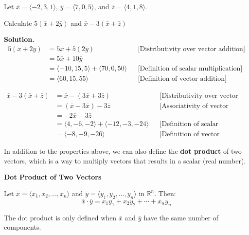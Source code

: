 

\begin{examplebox}
Let $\bar{x} = \langle -2, 3, 1 \rangle$, $\bar{y} = \langle 7, 0, 5 \rangle$, and $\bar{z} = \langle 4, 1, 8 \rangle$.

\vspace{1em}

Calculate $5(\bar{x} + 2\bar{y})$ and $\bar{x} - 3(\bar{x} + \bar{z})$

\vspace{1em}

\noindent\textbf{Solution.}
\begin{align*}
5(\bar{x} + 2\bar{y}) 
&= 5\bar{x} + 5(2\bar{y}) && \text{[Distributivity over vector addition]} \\
&= 5\bar{x} + 10\bar{y} \\
&= \langle -10, 15, 5 \rangle + \langle 70, 0, 50 \rangle && \text{[Definition of scalar multiplication]} \\
&= \langle 60, 15, 55 \rangle && \text{[Definition of vector addition]}
\end{align*}

\begin{align*}
\bar{x} - 3(\bar{x} + \bar{z}) 
&= \bar{x} - (3\bar{x} + 3\bar{z}) && \text{[Distributivity over vector addition]} \\
&= (\bar{x} - 3\bar{x}) - 3\bar{z} && \text{[Associativity of vector addition]} \\
&= -2\bar{x} - 3\bar{z} \\
&= \langle 4, -6, -2 \rangle + \langle -12, -3, -24 \rangle && \text{[Definition of scalar multiplication]} \\
&= \langle -8, -9, -26 \rangle && \text{[Definition of vector addition]}
\end{align*}
\end{examplebox}


In addition to the properties above, we can also define the \textbf{dot product} of two vectors, 
which is a way to multiply vectors that results in a scalar (real number).
\begin{definitionbox}
\textbf{Dot Product of Two Vectors}

Let $\bar{x} = \langle x_1, x_2, ..., x_n \rangle$ and $\bar{y} = \langle y_1, y_2, ..., y_n \rangle$ in $\mathbb{R}^n$. Then:
\[
\bar{x} \cdot \bar{y} = x_1 y_1 + x_2 y_2 + \cdots + x_n y_n
\]
\end{definitionbox}

\begin{remarkbox}
The dot product is only defined when $\bar{x}$ and $\bar{y}$ have the same number of components.
\end{remarkbox}

